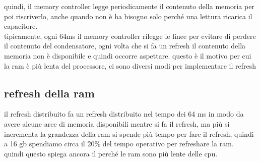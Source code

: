\documentclass[12pt, oneside]{extbook} %
\begin{document}
quindi, il memory controller legge periodicamente il contenuto della memoria per poi riscriverlo, anche quando non è ha bisogno solo perché una lettura ricarica il capacitore.\\tipicamente, ogni 64ms il memory controller rilegge le linee per evitare di perdere il contenuto del condensatore, ogni volta che si fa un refresh il contenuto della memoria non è disponibile e quindi occorre aspettare. questo è il motivo per cui la ram è più lenta del processore, ci sono diversi modi per implementare il refresh

\subsection{refresh della ram}
il refresh distribuito fa un refresh distribuito nel tempo dei 64 ms in modo da avere alcune aree di memoria disponibili mentre si fa il refresh, ma più si incrementa la grandezza della ram si spende più tempo per fare il refresh, quindi a 16 gb spendiamo circa il 20\% del tempo operativo per refreshare la ram.\\quindi questo spiega ancora il perché le ram sono più lente delle cpu.
\end{document}

